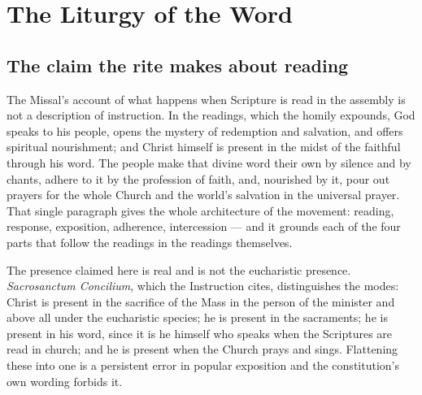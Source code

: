 \section{The Liturgy of the Word}

\subsection{The claim the rite makes about reading}

The Missal's account of what happens when Scripture is read in the assembly is not a
description of instruction. In the readings, which the homily expounds, God speaks to his
people, opens the mystery of redemption and salvation, and offers spiritual nourishment; and
Christ himself is present in the midst of the faithful through his word. The people make that
divine word their own by silence and by chants, adhere to it by the profession of faith, and,
nourished by it, pour out prayers for the whole Church and the world's salvation in the
universal prayer. That single paragraph gives the whole architecture of the movement: reading,
response, exposition, adherence, intercession --- and it grounds each of the four parts that
follow the readings in the readings themselves.

The presence claimed here is real and is not the eucharistic presence. \emph{Sacrosanctum
Concilium}, which the Instruction cites, distinguishes the modes: Christ is present in the
sacrifice of the Mass in the person of the minister and above all under the eucharistic
species; he is present in the sacraments; he is present in his word, since it is he himself who
speaks when the Scriptures are read in church; and he is present when the Church prays and
sings. Flattening
these into one is a persistent error in popular exposition and the constitution's own wording
forbids it.

